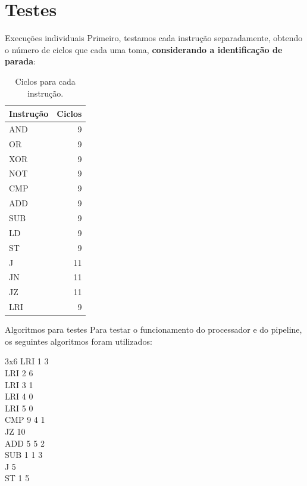 \documentclass{beamer}
\begin{document}
	\section{Testes}
	\begin{frame}{Execuções individuais}
		Primeiro, testamos cada instrução separadamente, obtendo o número de ciclos
		que cada uma toma, \textbf{considerando a identificação de parada}:

		\begin{table}[H]
		\footnotesize
		\centering
		\begin{tabular}{l | r}
		Instrução & Ciclos\\
			\hline
		    AND & 9\\ 
		    OR  & 9\\
		    XOR & 9\\
		    NOT & 9\\
		    CMP & 9\\
		    ADD & 9\\
		    SUB & 9\\
		    LD  & 9\\
		    ST  & 9\\
		    J   & 11\\
		    JN  & 11\\
		    JZ  & 11\\
		    LRI & 9\\
		\end{tabular}
		\label{tab:insttest}
		\caption{Ciclos para cada instrução.}
		\end{table}
	\end{frame}

	\begin{frame}{Algoritmos para testes}
		Para testar o funcionamento do processador e do pipeline, os seguintes algoritmos foram utilizados:\\
		\begin{block}{3x6}
		{\footnotesize
		LRI 1 3\\
		LRI 2 6\\
		LRI 3 1\\
		LRI 4 0\\
		LRI 5 0\\
		CMP 9 4 1\\
		JZ 10\\
		ADD 5 5 2\\
		SUB 1 1 3\\
		J 5\\
		ST 1 5\\
		}
		\end{block}
	\end{frame}
\end{document}
